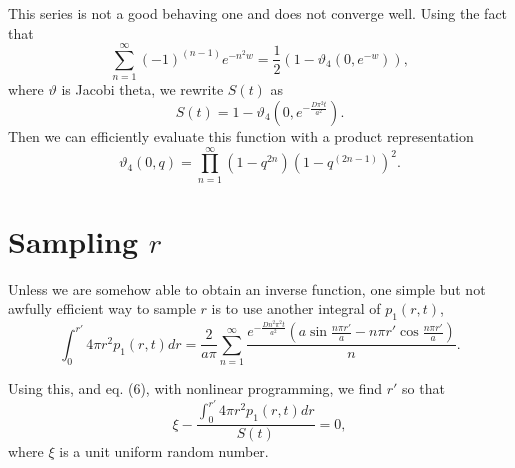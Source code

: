 \documentclass{article}
\begin{document}
This series is not a good behaving one and does not converge well.
Using the fact that
\begin{equation}
\sum_{n=1}^{\infty} (-1)^{(n-1)} e^{- n^2 w} = 
\frac{1}{2} ( 1 - \vartheta_4( 0, e^{-w} ) ),
\end{equation}
where $\vartheta$ is Jacobi theta, we rewrite $S(t)$ as 
\begin{equation}
S(t) = 1 - \vartheta_4( 0, e^{- \frac{D \pi^2 t}{a^2}} ).
\end{equation}
Then we can efficiently evaluate this function with a product 
representation
\begin{equation}
\vartheta_4( 0, q ) = \prod_{n=1}^{\infty} (1-q^{2n})(1-q^{(2n-1)})^2.
\end{equation}

\section{Sampling $r$}

Unless we are somehow able to obtain an inverse function, one
simple but not awfully efficient way to sample $r$ is to use another
integral of $p_1(r,t)$,
\begin{equation}
\int_{0}^{r'} 4 \pi r^2 p_1(r,t) dr = \frac{2}{a \pi} 
\sum_{n=1}^{\infty} \frac{e^{- \frac{D n^2 \pi^2 t}{a^2}}
\left( a \sin \frac{n \pi r'}{a} - n \pi r' \cos \frac{n \pi r'}{a} \right)}
{n}.
\end{equation}

Using this, and eq. (6), with nonlinear programming, we find $r'$ so that
\begin{equation}
\xi - \frac{\int_{0}^{r'} 4 \pi r^2 p_1(r,t) dr}{S(t)} = 0,
\end{equation}
where $\xi$ is a unit uniform random number.
\end{document}
